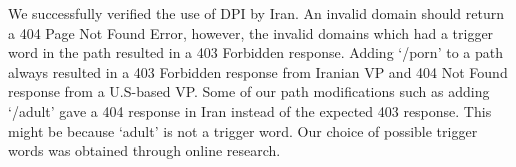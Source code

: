 We successfully verified the use of DPI by Iran. An invalid domain should return a 404 Page Not Found Error, however, the invalid domains which had a trigger word in the path resulted in a 403 Forbidden response. Adding `/porn' to a path always resulted in a 403 Forbidden response from Iranian VP and 404 Not Found response from a U.S-based VP. Some of our path modifications such as adding `/adult'  gave a 404 response in Iran instead of the expected 403 response. This might be because `adult' is not a trigger word. Our choice of possible trigger words was obtained through online research.\\ 



